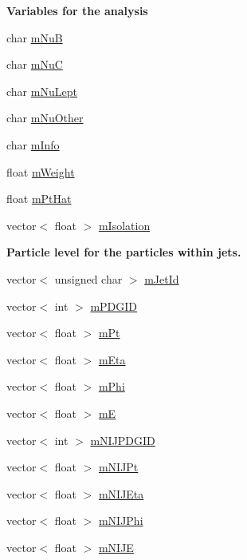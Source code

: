\begin{Indent}{\bf Variables for the analysis}
\begin{DoxyCompactItemize}
char \hyperlink{class_herwig_1_1_herwig_tree_acd4aa13b4a8936a89173fbb63ed161e8}{m\+NuB}
\item 
char \hyperlink{class_herwig_1_1_herwig_tree_a640d1260f445fbb7149fedc432319dfd}{m\+NuC}
\item 
char \hyperlink{class_herwig_1_1_herwig_tree_a70de329a4eda6e336b1a6154562e2637}{m\+Nu\+Lept}
\item 
char \hyperlink{class_herwig_1_1_herwig_tree_ab2546c8d2a180686b60c56dab084f90e}{m\+Nu\+Other}
\item 
char \hyperlink{class_herwig_1_1_herwig_tree_ac49d274539b787810d87c13984d1679f}{m\+Info}
\item 
float \hyperlink{class_herwig_1_1_herwig_tree_a161ab96ab6f288fcf9ae7da484b690f8}{m\+Weight}
\item 
float \hyperlink{class_herwig_1_1_herwig_tree_ab7d94d7d284990f8512a285a578bb0e5}{m\+Pt\+Hat}
\item 
vector$<$ float $>$ \hyperlink{class_herwig_1_1_herwig_tree_a216647b55088bd7af117564be968e4aa}{m\+Isolation}
\end{DoxyCompactItemize}
\end{Indent}
\begin{Indent}{\bf Particle level for the particles within jets.}\par
\begin{DoxyCompactItemize}
\item 
vector$<$ unsigned char $>$ \hyperlink{class_herwig_1_1_herwig_tree_a2b7790f57e9e3e44cb10747b0bafdaa1}{m\+Jet\+Id}
\item 
vector$<$ int $>$ \hyperlink{class_herwig_1_1_herwig_tree_ab6991935c69e5fb1f0e03e9e8e22fdd6}{m\+P\+D\+G\+ID}
\item 
vector$<$ float $>$ \hyperlink{class_herwig_1_1_herwig_tree_a545def11295a75086186c73aa393e0b4}{m\+Pt}
\item 
vector$<$ float $>$ \hyperlink{class_herwig_1_1_herwig_tree_a16fc9feb3ba75e30c41e3842b0b324af}{m\+Eta}
\item 
vector$<$ float $>$ \hyperlink{class_herwig_1_1_herwig_tree_a9d3ad17856037f6b1d3229ed9086f636}{m\+Phi}
\item 
vector$<$ float $>$ \hyperlink{class_herwig_1_1_herwig_tree_a14b6321a20f27ad9211ad7624113bb3b}{mE}
\item 
vector$<$ int $>$ \hyperlink{class_herwig_1_1_herwig_tree_a6fbb8c1dd6e2b4ed67122f74ab0da929}{m\+N\+I\+J\+P\+D\+G\+ID}
\item 
vector$<$ float $>$ \hyperlink{class_herwig_1_1_herwig_tree_a95e4e19ce467ec60b52960103eadeff7}{m\+N\+I\+J\+Pt}
\item 
vector$<$ float $>$ \hyperlink{class_herwig_1_1_herwig_tree_aef150f8f0a6ace649bb0d794577c6705}{m\+N\+I\+J\+Eta}
\item 
vector$<$ float $>$ \hyperlink{class_herwig_1_1_herwig_tree_a6d02449335894d8aaa1d794c08d18108}{m\+N\+I\+J\+Phi}
\item 
vector$<$ float $>$ \hyperlink{class_herwig_1_1_herwig_tree_a7b03a77b42e5d27533adcbeb6cc6e701}{m\+N\+I\+JE}
\end{DoxyCompactItemize}
\end{Indent}
